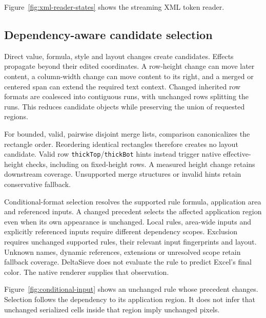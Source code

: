 Figure~\ref{fig:xml-reader-states} shows the streaming XML token reader.


\subsection{Dependency-aware candidate selection}
Direct value, formula, style and layout changes create candidates. Effects
propagate beyond their edited coordinates. A row-height change can move later
content, a column-width change can move content to its right, and a merged or
centered span can extend the required text context. Changed inherited row
formats are coalesced into contiguous runs, with unchanged rows splitting the
runs. This reduces candidate objects while preserving the union of requested
regions.

For bounded, valid, pairwise disjoint merge lists, comparison canonicalizes the
rectangle order. Reordering identical rectangles therefore creates no layout
candidate. Valid row \texttt{thickTop}/\texttt{thickBot} hints instead trigger
native effective-height checks, including on fixed-height rows. A measured
height change retains downstream coverage. Unsupported merge structures or
invalid hints retain conservative fallback.

Conditional-format selection resolves the supported rule formula, application
area and referenced inputs. A changed precedent selects the affected application
region even when its own appearance is unchanged. Local rules, area-wide inputs
and explicitly referenced inputs require different dependency scopes. Exclusion
requires unchanged supported rules, their relevant input fingerprints and layout.
Unknown names, dynamic references, extensions or unresolved scope retain fallback
coverage. DeltaSieve does not evaluate the rule to predict Excel's final color.
The native renderer supplies that observation.

Figure~\ref{fig:conditional-input} shows an unchanged rule whose precedent changes.
Selection follows the dependency to its application region. It does not infer
that unchanged serialized cells inside that region imply unchanged pixels.


